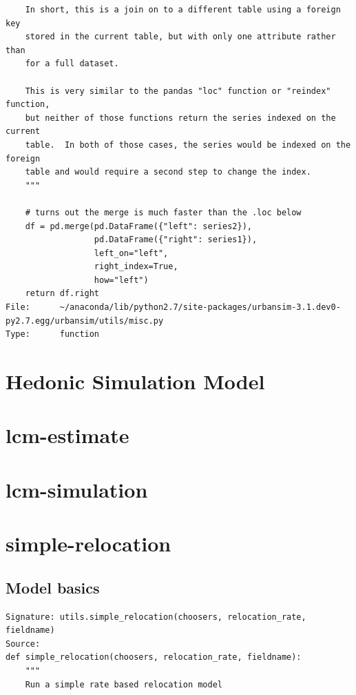\documentclass{article}\usepackage[]{graphicx}\usepackage[]{color}
\begin{document}
\begin{itemize}
\begin{itemize}
\begin{lstlisting}
    In short, this is a join on to a different table using a foreign key
    stored in the current table, but with only one attribute rather than
    for a full dataset.

    This is very similar to the pandas "loc" function or "reindex" function,
    but neither of those functions return the series indexed on the current
    table.  In both of those cases, the series would be indexed on the foreign
    table and would require a second step to change the index.
    """

    # turns out the merge is much faster than the .loc below
    df = pd.merge(pd.DataFrame({"left": series2}),
                  pd.DataFrame({"right": series1}),
                  left_on="left",
                  right_index=True,
                  how="left")
    return df.right
File:      ~/anaconda/lib/python2.7/site-packages/urbansim-3.1.dev0-py2.7.egg/urbansim/utils/misc.py
Type:      function
\end{lstlisting}
\end{itemize}




\section{Hedonic Simulation Model}







\section{lcm-estimate}


\section{lcm-simulation}


\section{simple-relocation}

\subsection{Model basics}


\begin{lstlisting}
Signature: utils.simple_relocation(choosers, relocation_rate, fieldname)
Source:
def simple_relocation(choosers, relocation_rate, fieldname):
    """
    Run a simple rate based relocation model


\end{lstlisting}
\end{itemize}
\end{document}
